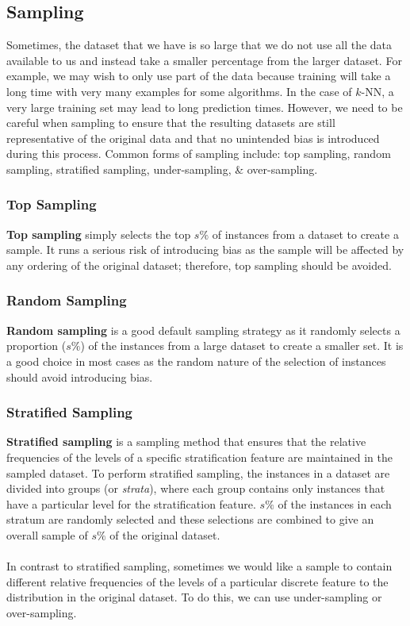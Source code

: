 \documentclass[a4paper,11pt]{article}
\begin{document}
\subsection{Sampling}
Sometimes, the dataset that we have is so large that we do not use all the data available to us and instead take a smaller percentage from the larger dataset.
For example, we may wish to only use part of the data because training will take a long time with very many examples for some algorithms.
In the case of $k$-NN, a very large training set may lead to long prediction times.
However, we need to be careful when sampling to ensure that the resulting datasets are still representative of the original data and that no unintended bias is introduced during this process.
Common forms of sampling include: top sampling, random sampling, stratified sampling, under-sampling, \& over-sampling.

\subsubsection{Top Sampling}
\textbf{Top sampling} simply selects the top $s\%$ of instances from a dataset to create a sample.
It runs a serious risk of introducing bias as the sample will be affected by any ordering of the original dataset; therefore, top sampling should be avoided.

\subsubsection{Random Sampling}
\textbf{Random sampling} is a good default sampling strategy as it randomly selects a proportion ($s\%$) of the instances from a large dataset to create a smaller set.
It is a good choice in most cases as the random nature of the selection of instances should avoid introducing bias.

\subsubsection{Stratified Sampling}
\textbf{Stratified sampling} is a sampling method that ensures that the relative frequencies of the levels of a specific stratification feature are maintained in the sampled dataset.
To perform stratified sampling, the instances in a dataset are divided into groups (or \textit{strata}), where each group contains only instances that have a particular level for the stratification feature.
$s\%$ of the instances in each stratum are randomly selected and these selections are combined to give an overall sample of $s\%$ of the original dataset.
\\\\
In contrast to stratified sampling, sometimes we would like a sample to contain different relative frequencies of the levels of a particular discrete feature to the distribution in the original dataset.
To do this, we can use under-sampling or over-sampling.
\end{document}
